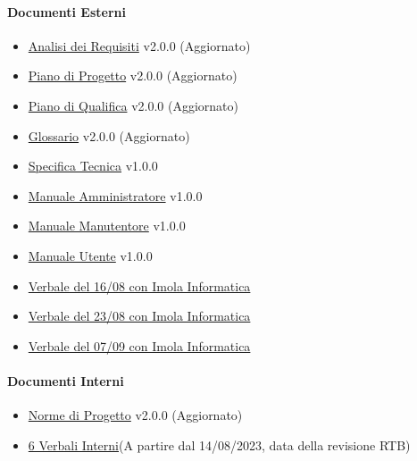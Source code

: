 \documentclass[12pt, a4paper]{article}
\begin{document}
\paragraph{Documenti Esterni}
\begin{itemize}
    \item \href{https://github.com/4ourSquared/LumosMinima/tree/main/public/esterni/analisi_dei_requisiti_v2.0.0.pdf}{Analisi dei Requisiti} v2.0.0 (Aggiornato)
    \item \href{https://github.com/4ourSquared/LumosMinima/tree/main/public/esterni/piano_di_progetto_v2.0.0.pdf}{Piano di Progetto} v2.0.0 (Aggiornato)
    \item \href{https://github.com/4ourSquared/LumosMinima/tree/main/public/esterni/piano_di_qualifica_v2.0.0.pdf}{Piano di Qualifica} v2.0.0 (Aggiornato)
    \item \href{https://github.com/4ourSquared/LumosMinima/tree/main/public/esterni/glossario_v2.0.0.pdf}{Glossario} v2.0.0 (Aggiornato)
    \item \href{https://github.com/4ourSquared/LumosMinima/tree/main/public/esterni/specifica_tecnica_v1.0.0.pdf}{Specifica Tecnica} v1.0.0
    \item \href{https://github.com/4ourSquared/LumosMinima/tree/main/public/esterni/manuale_amministratore_v1.0.0.pdf}{Manuale Amministratore} v1.0.0
    \item \href{https://github.com/4ourSquared/LumosMinima/tree/main/public/esterni/manuale_manutentore_v1.0.0.pdf}{Manuale Manutentore} v1.0.0
    \item \href{https://github.com/4ourSquared/LumosMinima/tree/main/public/esterni/manuale_utente_v1.0.0.pdf}{Manuale Utente} v1.0.0
    \item \href{https://github.com/4ourSquared/LumosMinima/tree/main/public/esterni/verbali/2023_08_16_E.pdf}{Verbale del 16/08 con Imola Informatica}
    \item \href{https://github.com/4ourSquared/LumosMinima/tree/main/public/esterni/verbali/2023_08_23_E.pdf}{Verbale del 23/08 con Imola Informatica}
    \item \href{https://github.com/4ourSquared/LumosMinima/tree/main/public/esterni/verbali/2023_09_07_E.pdf}{Verbale del 07/09 con Imola Informatica}
\end{itemize}
\paragraph{Documenti Interni}
\begin{itemize}
    \item \href{https://github.com/4ourSquared/LumosMinima/tree/main/public/interni/norme_di_progetto_v2.0.0.pdf}{Norme di Progetto} v2.0.0 (Aggiornato)
    \item \href{https://github.com/4ourSquared/LumosMinima/tree/main/public/interni/verbali}{6 Verbali Interni}(A partire dal 14/08/2023, data della revisione RTB)
\end{itemize}
\end{document}
